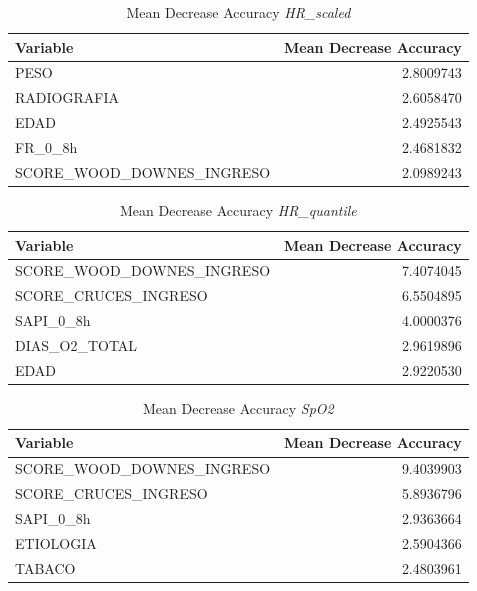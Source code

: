 \begin{table}[H]
    \centering
    \begin{tabular}{lr}
        \toprule
        \textbf{Variable} & \textbf{Mean Decrease Accuracy} \\
        \midrule
        PESO & 2.8009743 \\
        RADIOGRAFIA & 2.6058470 \\
        EDAD & 2.4925543 \\
        FR\_0\_8h & 2.4681832 \\
        SCORE\_WOOD\_DOWNES\_INGRESO & 2.0989243 \\
        \bottomrule
    \end{tabular}
    \caption{Mean Decrease Accuracy \textit{HR\_scaled}}
\end{table}

\begin{table}[H]
    \centering
    \begin{tabular}{lr}
        \toprule
        \textbf{Variable} & \textbf{Mean Decrease Accuracy} \\
        \midrule
        SCORE\_WOOD\_DOWNES\_INGRESO & 7.4074045 \\
        SCORE\_CRUCES\_INGRESO & 6.5504895 \\
        SAPI\_0\_8h & 4.0000376 \\
        DIAS\_O2\_TOTAL & 2.9619896 \\
        EDAD & 2.9220530 \\
        \bottomrule
    \end{tabular}
    \caption{Mean Decrease Accuracy \textit{HR\_quantile}} 
\end{table}

\begin{table}[H]
    \centering
    \begin{tabular}{lr}
        \toprule
        \textbf{Variable} & \textbf{Mean Decrease Accuracy} \\
        \midrule
        SCORE\_WOOD\_DOWNES\_INGRESO & 9.4039903 \\
        SCORE\_CRUCES\_INGRESO & 5.8936796 \\
        SAPI\_0\_8h & 2.9363664 \\
        ETIOLOGIA & 2.5904366 \\
        TABACO & 2.4803961 \\
        \bottomrule
    \end{tabular}
    \caption{Mean Decrease Accuracy \textit{SpO2}}
\end{table}

